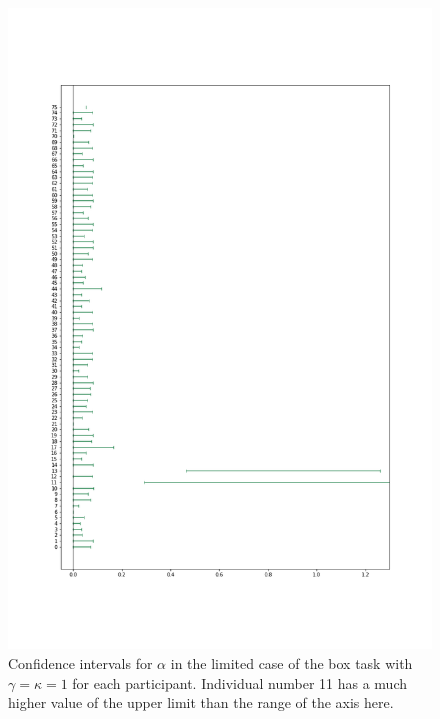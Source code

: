 \begin{figure}
    \centering
    \includegraphics[scale=0.37]{pictures/all_cis_lim_alpha.png} %
    \caption[CIs for $\alpha$, limited. $\gamma=\kappa=1$]{Confidence intervals for $\alpha$ in the limited case of the box task with $\gamma=\kappa=1$ for each participant. Individual number 11 has a much higher value of the upper limit than the range of the axis here. }
    \label{fig:all_cis_alpha_lim}
\end{figure}

